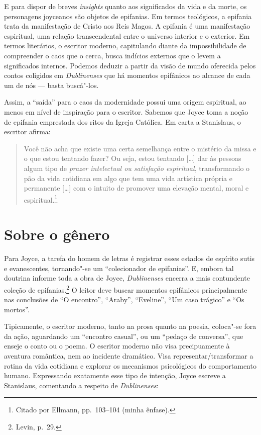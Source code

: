 {E para dispor de breves \textit{insights} quanto aos significados da vida e da
morte, os personagens joyceanos são objetos de epifanias. Em termos teológicos,
a epifania trata da manifestação de Cristo aos Reis Magos.  A epifania é uma
manifestação espiritual, uma relação transcendental entre o universo interior e
o exterior. Em termos literários, o escritor moderno, capitulando diante da
impossibilidade de compreender o caos que o cerca, busca indícios externos que
o levem a significados internos. Podemos deduzir a partir da visão de mundo
oferecida pelos contos coligidos em \textit{Dublinenses} que há momentos
epifânicos ao alcance de cada um de nós --- basta buscá"-los.

Assim, a “saída” para o caos da modernidade possui uma origem espiritual, ao
menos em nível de inspiração para o escritor. Sabemos que Joyce toma a noção de
epifania emprestada dos ritos da Igreja Católica. Em carta a Stanislaus, o
escritor afirma: 

\begin{quote}
Você não acha que existe uma certa semelhança entre o mistério da missa e o que
estou tentando fazer? Ou seja, estou tentando [\ldots{}] dar às pessoas algum tipo
de \textit{prazer intelectual ou satisfação espiritual}, transformando o pão da
vida cotidiana em algo que tem uma vida artística própria e permanente [\ldots{}]
com o intuito de promover uma elevação mental, moral e
espiritual.\footnote{ Citado por Ellmann, pp.~103--104 (minha ênfase).}
\end{quote}

\section{Sobre o gênero}

Para Joyce, a tarefa do homem de letras é registrar esses estados de
espírito sutis e evanescentes, tornando"-se um “colecionador de epifanias”. E,
embora tal doutrina informe toda a obra de Joyce, \textit{Dublinenses} encerra a
mais contundente coleção de epifanias.\footnote{ Levin, p.~29.} O leitor deve buscar
momentos epifânicos principalmente nas conclusões de “O encontro”, “Araby”,
“Eveline”, “Um caso trágico” e “Os mortos”.

Tipicamente, o escritor moderno, tanto na prosa quanto na poesia, coloca"-se fora
da ação, aguardando um “encontro casual”, ou um “pedaço de conversa”, que
enseje o conto ou o poema. O escritor moderno não visa precipuamente à aventura
romântica, nem ao incidente dramático. Visa representar/transformar a rotina da
vida cotidiana e explorar os mecanismos psicológicos do comportamento humano.
Expressando exatamente esse tipo de intenção, Joyce escreve a Stanislaus,
comentando a respeito de \textit{Dublinenses}: 

}
